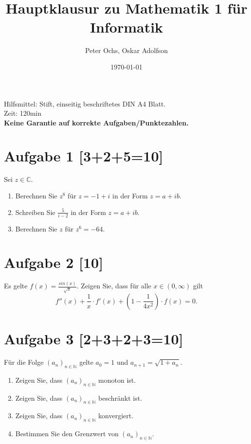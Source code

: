 \documentclass[a4paper, 11pt]{article}
\newcommand{\N}{\mathbb{N}}
\newcommand{\C}{\mathbb{C}}
\begin{document}
\title{\vspace{-2.0cm}Hauptklausur zu Mathematik 1 für Informatik}
\author{Peter Ochs, Oskar Adolfson}
\date{\today}

\maketitle

\begin{center}
	Hilfsmittel: Stift, einseitig beschriftetes DIN A4 Blatt.\\
	Zeit: 120min\\
	\textbf{Keine Garantie auf korrekte Aufgaben/Punktezahlen.}
\end{center}

\section*{Aufgabe 1 [3+2+5=10]}
Sei $z\in\C$.
\begin{enumerate}[label=(\alph*)]
	\item Berechnen Sie $z^8$ für $z=-1+i$ in der Form $z = a+ib$.
	\item Schreiben Sie $\frac{5}{i-2}$ in der Form $z = a+ib$.
	\item Berechnen Sie $z$ für $z^6=-64$.
\end{enumerate}

\section*{Aufgabe 2 [10]}
Es gelte $f(x) = \frac{sin(x)}{\sqrt{x}}$. Zeigen Sie, dass für alle $x\in(0,\infty)$ gilt $$f''(x)+\frac{1}{x} \cdot f'(x) + \left(1-\frac{1}{4x^2}\right) \cdot f(x) = 0.$$

\section*{Aufgabe 3 [2+3+2+3=10]}
Für die Folge $(a_n)_{n\in\N}$ gelte $a_0 = 1$ und $a_{n+1} = \sqrt{1+a_n}$.
\begin{enumerate}[label=(\alph*)]
	\item Zeigen Sie, dass $(a_n)_{n\in\N}$ monoton ist.
	\item Zeigen Sie, dass $(a_n)_{n\in\N}$ beschränkt ist.
	\item Zeigen Sie, dass $(a_n)_{n\in\N}$ konvergiert.
	\item Bestimmen Sie den Grenzwert von $(a_n)_{n\in\N}$.
\end{enumerate}
\end{document}
